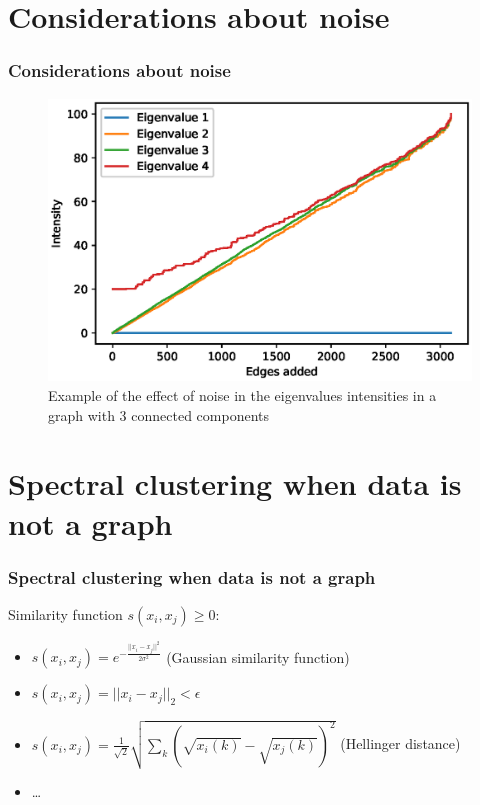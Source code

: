 \documentclass{beamer}
\begin{document}
\section{Considerations about noise}
\begin{frame}
  \frametitle{Considerations about noise}
  \begin{figure}
    \centering
    \includegraphics[width=0.5\linewidth]{figures/adding-noise.eps}
    \caption{Example of the effect of noise in the eigenvalues intensities in a graph with 3 connected components}
    \label{figure:addingnoise}
  \end{figure}
\end{frame}

\section{Spectral clustering when data is not a graph}
\begin{frame}
  \frametitle{Spectral clustering when data is not a graph}
  Similarity function $s(x_i, x_j) \geq 0$:
  \begin{itemize}
    \item $s(x_i, x_j) = e^{ - \frac{||x_i - x_j||^2}{2\sigma^2}}$ (Gaussian similarity function)
    \item $s(x_i, x_j) = ||x_i - x_j||_2 < \epsilon$
    \item $s(x_i, x_j) = \frac{1}{\sqrt{2}} \sqrt{\sum_k (\sqrt{x_i(k)} - \sqrt{x_j(k)})^2}$ (Hellinger distance)
    \item \dots
  \end{itemize}
\end{frame}
\end{document}

